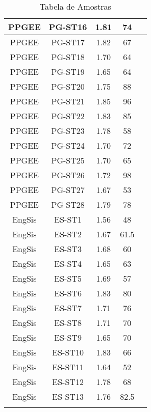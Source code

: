 \documentclass[12pt, a4paper]{article}
\begin{document}
\begin{longtable}{|c|c|c|c|c|}
\rule[-1.0ex]{0pt}{4.0ex}
PPGEE&PG-ST16&1.81&74& \\ \hline
\rule[-1.0ex]{0pt}{4.0ex}
PPGEE&PG-ST17&1.82&67& \\ \hline
\rule[-1.0ex]{0pt}{4.0ex}
PPGEE&PG-ST18&1.70&64& \\ \hline
\rule[-1.0ex]{0pt}{4.0ex}
PPGEE&PG-ST19&1.65&64& \\ \hline
\rule[-1.0ex]{0pt}{4.0ex}
PPGEE&PG-ST20&1.75&88& \\ \hline
\rule[-1.0ex]{0pt}{4.0ex}
PPGEE&PG-ST21&1.85&96& \\ \hline
\rule[-1.0ex]{0pt}{4.0ex}
PPGEE&PG-ST22&1.83&85& \\ \hline
\rule[-1.0ex]{0pt}{4.0ex}
PPGEE&PG-ST23&1.78&58& \\ \hline
\rule[-1.0ex]{0pt}{4.0ex}
PPGEE&PG-ST24&1.70&72& \\ \hline
\rule[-1.0ex]{0pt}{4.0ex}
PPGEE&PG-ST25&1.70&65& \\ \hline
\rule[-1.0ex]{0pt}{4.0ex}
PPGEE&PG-ST26&1.72&98& \\ \hline
\rule[-1.0ex]{0pt}{4.0ex}
PPGEE&PG-ST27&1.67&53& \\ \hline
\rule[-1.0ex]{0pt}{4.0ex}
PPGEE&PG-ST28&1.79&78& \\ \hline
\rule[-1.0ex]{0pt}{4.0ex}
EngSis&ES-ST1&1.56&48& \\ \hline
\rule[-1.0ex]{0pt}{4.0ex}
EngSis&ES-ST2&1.67&61.5& \\ \hline
\rule[-1.0ex]{0pt}{4.0ex}
EngSis&ES-ST3&1.68&60& \\ \hline
\rule[-1.0ex]{0pt}{4.0ex}
EngSis&ES-ST4&1.65&63& \\ \hline
\rule[-1.0ex]{0pt}{4.0ex}
EngSis&ES-ST5&1.69&57& \\ \hline
\rule[-1.0ex]{0pt}{4.0ex}
EngSis&ES-ST6&1.83&80& \\ \hline
\rule[-1.0ex]{0pt}{4.0ex}
EngSis&ES-ST7&1.71&76& \\ \hline
\rule[-1.0ex]{0pt}{4.0ex}
EngSis&ES-ST8&1.71&70& \\ \hline
\rule[-1.0ex]{0pt}{4.0ex}
EngSis&ES-ST9&1.65&70& \\ \hline
\rule[-1.0ex]{0pt}{4.0ex}
EngSis&ES-ST10&1.83&66& \\ \hline
\rule[-1.0ex]{0pt}{4.0ex}
EngSis&ES-ST11&1.64&52& \\ \hline
\rule[-1.0ex]{0pt}{4.0ex}
EngSis&ES-ST12&1.78&68& \\ \hline
\rule[-1.0ex]{0pt}{4.0ex}
EngSis&ES-ST13&1.76&82.5& \\ \hline
\caption{Tabela de Amostras}
\label{table:amostra}
\end{longtable}
\end{document}
